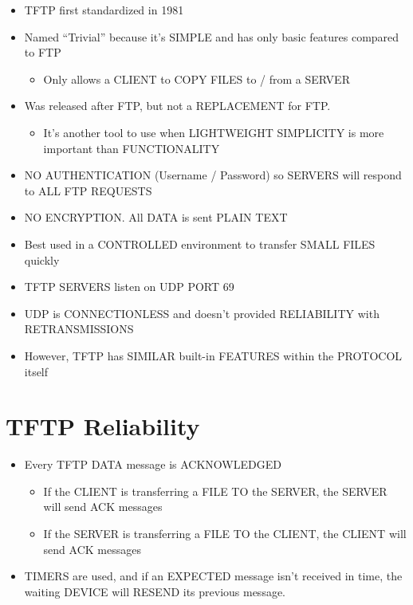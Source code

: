 \begin{itemize}
\tightlist
\item
  TFTP first standardized in 1981
\item
  Named ``Trivial'' because it's SIMPLE and has only basic features
  compared to FTP

  \begin{itemize}
  \tightlist
  \item
    Only allows a CLIENT to COPY FILES to / from a SERVER
  \end{itemize}
\item
  Was released after FTP, but not a REPLACEMENT for FTP.

  \begin{itemize}
  \tightlist
  \item
    It's another tool to use when LIGHTWEIGHT SIMPLICITY is more
    important than FUNCTIONALITY
  \end{itemize}
\item
  NO AUTHENTICATION (Username / Password) so SERVERS will respond to ALL
  FTP REQUESTS
\item
  NO ENCRYPTION. All DATA is sent PLAIN TEXT
\item
  Best used in a CONTROLLED environment to transfer SMALL FILES quickly
\item
  TFTP SERVERS listen on UDP PORT 69
\item
  UDP is CONNECTIONLESS and doesn't provided RELIABILITY with
  RETRANSMISSIONS
\item
  However, TFTP has SIMILAR built-in FEATURES within the PROTOCOL itself
\end{itemize}

\section{TFTP Reliability}\label{tftp-reliability}

\begin{itemize}
\tightlist
\item
  Every TFTP DATA message is ACKNOWLEDGED

  \begin{itemize}
  \tightlist
  \item
    If the CLIENT is transferring a FILE TO the SERVER, the SERVER will
    send ACK messages
  \item
    If the SERVER is transferring a FILE TO the CLIENT, the CLIENT will
    send ACK messages
  \end{itemize}
\item
  TIMERS are used, and if an EXPECTED message isn't received in time,
  the waiting DEVICE will RESEND its previous message.
\end{itemize}

